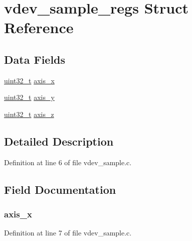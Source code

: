 \hypertarget{structvdev__sample__regs}{\section{vdev\-\_\-sample\-\_\-regs \-Struct \-Reference}
\label{structvdev__sample__regs}
}
\subsection*{\-Data \-Fields}
\begin{DoxyCompactItemize}
\item 
\hyperlink{arch__types_8h_a435d1572bf3f880d55459d9805097f62}{uint32\-\_\-t} \hyperlink{structvdev__sample__regs_ab3bbecd849cbbc67f7eb4283c85b3bc2}{axis\-\_\-x}
\item 
\hyperlink{arch__types_8h_a435d1572bf3f880d55459d9805097f62}{uint32\-\_\-t} \hyperlink{structvdev__sample__regs_aee31f70174d5b49133d692f81cff4a6d}{axis\-\_\-y}
\item 
\hyperlink{arch__types_8h_a435d1572bf3f880d55459d9805097f62}{uint32\-\_\-t} \hyperlink{structvdev__sample__regs_a029159ff03e2997021f9c10127be21f8}{axis\-\_\-z}
\end{DoxyCompactItemize}


\subsection{\-Detailed \-Description}


\-Definition at line 6 of file vdev\-\_\-sample.\-c.



\subsection{\-Field \-Documentation}
\hypertarget{structvdev__sample__regs_ab3bbecd849cbbc67f7eb4283c85b3bc2}{
\subsubsection[{axis\-\_\-x}]{ {\bf axis\-\_\-x}}}\label{structvdev__sample__regs_ab3bbecd849cbbc67f7eb4283c85b3bc2}


\-Definition at line 7 of file vdev\-\_\-sample.\-c.

